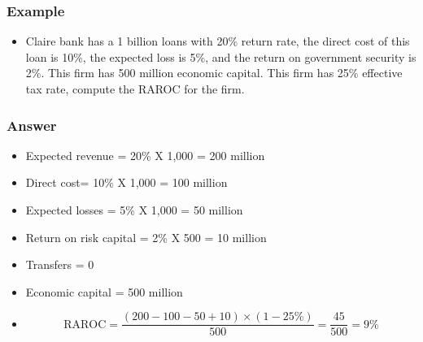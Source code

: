 \subsubsection{Example}
\begin{itemize}
\item Claire bank has a 1 billion loans with 20\% return rate, the direct cost of this loan is 10\%, the expected loss is 5\%, and the return on government security is 2\%. This firm has 500 million economic capital. This firm has 25\% effective tax rate, compute the RAROC for the firm.
\end{itemize}


\subsubsection{Answer}
\begin{itemize}
\item Expected revenue = 20\% X 1,000 = 200 million
\item Direct cost= 10\% X 1,000 = 100 million
\item Expected losses = 5\% X 1,000 = 50 million
\item Return on risk capital = 2\% X 500 = 10 million
\item Transfers = 0
\item Economic capital = 500 million
\item \begin{equation}
    \text{RAROC} = \frac{(200 - 100 - 50 + 10) \times (1 - 25\%)}{500} = \frac{45}{500} = 9\%
    \end{equation}
\end{itemize}


